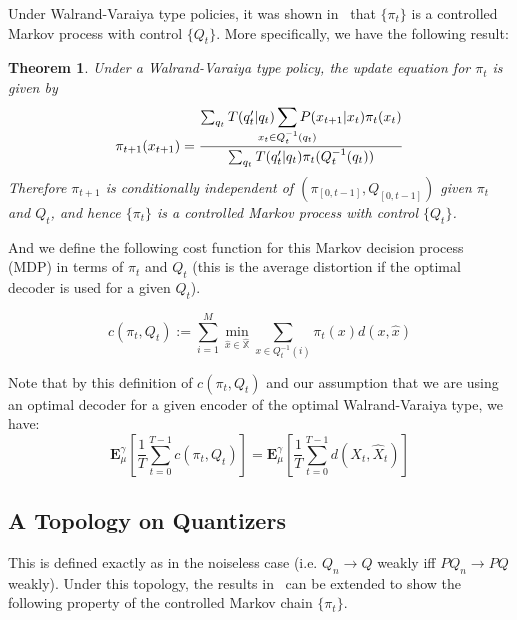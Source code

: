 \documentclass[conference]{IEEEtran}
\newtheorem{theorem}{Theorem}[section]
\begin{document}
Under Walrand-Varaiya type policies, it was shown in~\cite{Linder} that \( \{\pi_t\} \) is a controlled Markov process with control \( \{Q_t\} \). More specifically, we have the following result:
\begin{theorem}\cite{Linder}
    Under a Walrand-Varaiya type policy, the update equation for \(\pi_t\) is given by
    \begin{equation}
        \pi_{t+1}(x_{t+1}) = \frac{\sum_{q_t}T(q'_t|q_t) \smashoperator[lr]{\sum_{x_t \in Q_t^{-1}(q_t)}}P(x_{t+1}|x_t)\pi_t(x_t)}{\sum_{q_t}T(q'_t|q_t)\pi_t(Q_t^{-1}(q_t))}\label{eq:1}
    \end{equation}
    Therefore \( \pi_{t+1} \) is conditionally independent of \( (\pi_{[0,t-1]}, Q_{[0,t-1]}) \) given \( \pi_t \) and \( Q_t \), and hence \( \{\pi_t\} \) is a controlled Markov process with control \( \{Q_t\} \).
\end{theorem}

And we define the following cost function for this Markov decision process (MDP) in terms of \( \pi_t \) and \( Q_t \) (this is the average distortion if the optimal decoder is used for a given \(Q_t\)).

\begin{equation}\label{eq:cost}
    c(\pi_t, Q_t) := \sum_{i=1}^{M} \min_{\hat{x} \in \hat{\mathbb{X}}} \sum_{x \in Q_t^{-1}(i)} \pi_t(x)d(x,\hat{x})
\end{equation}

Note that by this definition of \( c(\pi_t,Q_t) \) and our assumption that we are using an optimal decoder for a given encoder of the optimal Walrand-Varaiya type, we have:
\[\mathbf{E}_{\mu}^{\gamma}\left[\frac{1}{T}\sum_{t=0}^{T-1}c(\pi_t,Q_t)\right] = \mathbf{E}_{\mu}^{\gamma}\left[\frac{1}{T}\sum_{t=0}^{T-1}d(X_t,\hat{X}_t)\right]\]


\subsection{A Topology on Quantizers}
This is defined exactly as in the noiseless case (i.e. \(Q_n \to Q\) weakly iff \(PQ_n \to PQ\) weakly). Under this topology, the results in~\cite{Linder} can be extended to show the following property of the controlled Markov chain \( \{\pi_t\} \).
\end{document}
